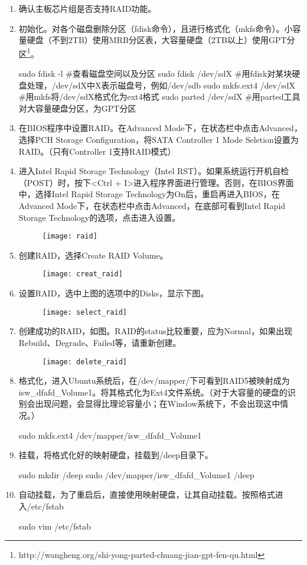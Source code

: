 \begin{enumerate}
\item 确认主板芯片组是否支持RAID功能。
\item 初始化。对各个磁盘删除分区（fdisk命令），且进行格式化（mkfs命令）。小容量硬盘（不到2TB）使用MRB分区表，大容量硬盘（2TB以上）使用GPT分区\footnote{http://wangheng.org/shi-yong-parted-chuang-jian-gpt-fen-qu.html}。
\begin{bash}
sudo fdisk -l		   #查看磁盘空间以及分区
sudo fdisk /dev/sdX  #用fdisk对某块硬盘处理，/dev/sdX中X表示磁盘号，例如/dev/sdb
sudo mkfs.ext4 /dev/sdX    #用mkfs将/dev/sdX格式化为ext4格式
sudo parted /dev/sdX	#用parted工具对大容量硬盘分区，为GPT分区
\end{bash}
\item 在BIOS程序中设置RAID。在Advanced Mode下，在状态栏中点击Advanced，选择PCH Storage Configuration，将SATA Controller 1 Mode Seletion设置为RAID。（只有Controller 1支持RAID模式）
\item 进入Intel Rapid Storage Technology（Intel RST）。如果系统运行开机自检（POST）时，按下<Ctrl + I>进入程序界面进行管理。否则，在BIOS界面中，选择Intel Rapid Storage Technology为On后，重启再进入BIOS，在Advanced Mode下，在状态栏中点击Advanced，在底部可看到Intel Rapid Storage Technology的选项，点击进入设置。
\begin{figure}[!ht]
\centering
\texttt{[image: raid]}
\end{figure}
\item 创建RAID，选择Create RAID Volume。
\begin{figure}[!ht]
\centering
\texttt{[image: creat\_raid]}
\end{figure}
\item 设置RAID，选中上图的选项中的Disks，显示下图。
\begin{figure}[!ht]
\centering
\texttt{[image: select\_raid]}
\end{figure}
\item 创建成功的RAID，如图。RAID的status比较重要，应为Normal，如果出现Rebuild、Degrade、Failed等，请重新创建。
\begin{figure}[!ht]
\centering
\texttt{[image: delete\_raid]}
\end{figure}
\item 格式化，进入Ubuntu系统后，在/dev/mapper/下可看到RAID5被映射成为isw\_dfafd\_Volume1。将其格式化为Ext4文件系统。（对于大容量的硬盘的识别会出现问题，会显得比理论容量小；在Window系统下，不会出现这中情况。）
\begin{bash}
sudo mkfs.ext4 /dev/mapper/isw_dfafd_Volume1
\end{bash}
\item 挂载，将格式化好的映射硬盘，挂载到/deep目录下。
\begin{bash}
sudo mkdir /deep
sudo /dev/mapper/isw_dfafd_Volume1 /deep
\end{bash}
\item 自动挂载，为了重启后，直接使用映射硬盘，让其自动挂载。按照格式进入/etc/fstab
\begin{bash}
sudo vim /etc/fstab
\end{bash}
\end{enumerate}


